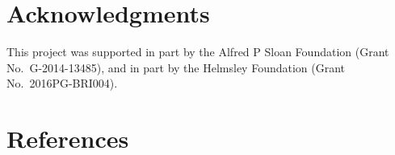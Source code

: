 \documentclass[author-year, review, 11pt]{components/elsarticle} %
\begin{document}
\hypertarget{acknowledgments}{%
\section{Acknowledgments}\label{acknowledgments}}

This project was supported in part by the Alfred P Sloan Foundation
(Grant No.~G-2014-13485), and in part by the Helmsley Foundation (Grant
No.~2016PG-BRI004).

\hypertarget{references}{%
\section{References}\label{references}}
\end{document}
